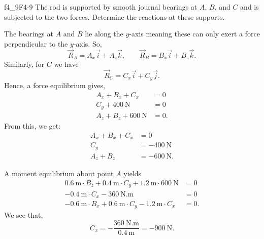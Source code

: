 
\begin{problemwithimage}{f4_9}{F4-9}
  The rod is supported by smooth journal bearings at $A$, $B$, and $C$ and is subjected to the two forces.
  Determine the reactions at these supports.
\end{problemwithimage}

\begin{derivation}
  The bearings at $A$ and $B$ lie along the $y$-axis meaning these can only exert a force perpendicular to the $y$-axis.
  So,
  \begin{equation*}
    \Vec{R}_A = A_x \Vec{i} + A_z \Vec{k}, \qquad \Vec{R}_B = B_x \Vec{i} + B_z \Vec{k}
  .\end{equation*}
  Similarly, for $C$ we have
  \begin{equation*}
    \Vec{R}_C = C_x \Vec{i} + C_y \Vec{j}
  .\end{equation*}
  Hence, a force equilibrium gives,
  \begin{align*}
    A_x + B_x + C_x &= 0 \\
    C_y + \qty{400}{\N} &= 0 \\
    A_z + B_z + \qty{600}{\N} &= 0
  .\end{align*}
  From this, we get:
  \begin{align*}
    A_x + B_x + C_x &= 0 \\
    C_y &= - \qty{400}{\N}  \\
    A_z + B_z &= - \qty{600}{\N}
  .\end{align*}
  
  A moment equilibrium about point $A$ yields
  \begin{align*}
    \qty{0,6}{\m} \cdot B_z + \qty{0,4}{\m} \cdot  C_y + \qty{1,2}{\m} \cdot  \qty{600}{\N} &= 0 \\
    - \qty{0,4}{\m} \cdot  C_x - \qty{360}{\N.\m}  &= 0 \\
    - \qty{0,6}{\m} \cdot B_x + \qty{0,6}{\m} \cdot  C_y - \qty{1,2}{\m} \cdot  C_x &= 0
  .\end{align*}
  We see that,
  \begin{equation*}
    C_x = -\frac{\qty{360}{\N.\m}}{\qty{0.4}{\m} }  = -\qty{900}{\N}
  .\end{equation*}
  

\end{derivation}
